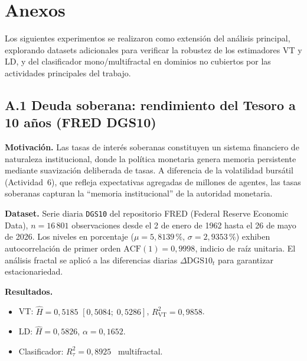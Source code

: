 \newpage
\section*{Anexos}

Los siguientes experimentos se realizaron como extensi\'{o}n del an\'{a}lisis
principal, explorando datasets adicionales para verificar la robustez de
los estimadores VT y LD, y del clasificador mono/multifractal en dominios
no cubiertos por las actividades principales del trabajo.

\subsection*{A.1 Deuda soberana: rendimiento del Tesoro a 10 a\~{n}os (FRED DGS10)}

\textbf{Motivaci\'{o}n.} Las tasas de inter\'{e}s soberanas constituyen un
sistema financiero de naturaleza institucional, donde la pol\'{i}tica
monetaria genera memoria persistente mediante suavizaci\'{o}n deliberada de
tasas. A diferencia de la volatilidad burs\'{a}til (Actividad~6), que refleja
expectativas agregadas de millones de agentes, las tasas soberanas
capturan la ``memoria institucional'' de la autoridad monetaria.

\textbf{Dataset.} Serie diaria \texttt{DGS10} del repositorio FRED
(Federal Reserve Economic Data), $n = 16\,801$ observaciones desde el
2 de enero de 1962 hasta el 26 de mayo de 2026. Los niveles en porcentaje
($\mu = 5{,}8139\,\%$, $\sigma = 2{,}9353\,\%$) exhiben
autocorrelaci\'{o}n de primer orden $\text{ACF}(1) = 0{,}9998$, indicio de
ra\'{i}z unitaria. El an\'{a}lisis fractal se aplic\'{o} a las diferencias diarias
$\Delta \text{DGS10}_t$ para garantizar estacionariedad.

\textbf{Resultados.}
\begin{itemize}[leftmargin=2em, nosep]
    \item VT: $\hat{H} = 0{,}5185$ $[0{,}5084;\; 0{,}5286]$,
          $R^2_{\text{VT}} = 0{,}9858$.
    \item LD: $\hat{H} = 0{,}5826$, $\alpha = 0{,}1652$.
    \item Clasificador: $R^2_{\tau} = 0{,}8925$ \textrightarrow\ multifractal.
\end{itemize}

